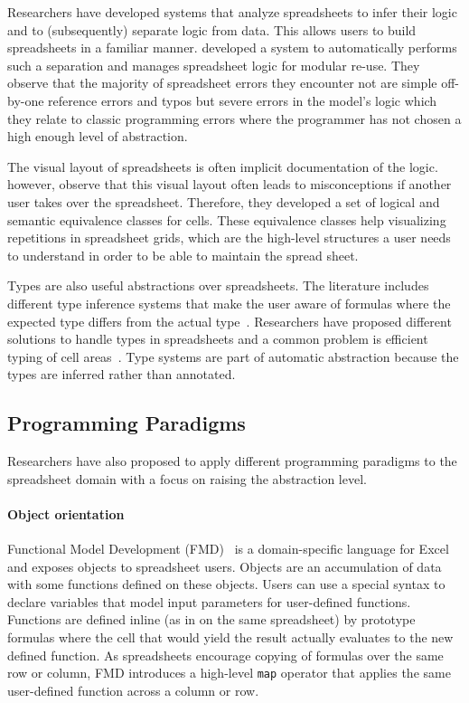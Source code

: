 \documentclass[a4paper]{article}
\begin{document}
Researchers have developed systems that analyze spreadsheets to infer
their logic and to (subsequently) separate logic from data. This
allows users to build spreadsheets in a familiar
manner. \citet{Isakowitz:1995:TLT:195705.195708} developed a system to
automatically performs such a separation and manages spreadsheet logic
for modular re-use. They observe that the majority of spreadsheet
errors they encounter not are simple off-by-one reference errors and
typos but severe errors in the model's logic which they relate to
classic programming errors where the programmer has not chosen a high
enough level of abstraction.

The visual layout of spreadsheets is often implicit documentation of
the logic. \citet{1173080} however, observe that this visual layout
often leads to misconceptions if another user takes over the
spreadsheet. Therefore, they developed a set of logical and semantic
equivalence classes for cells. These equivalence classes help
visualizing repetitions in spreadsheet grids, which are the high-level
structures a user needs to understand in order to be able to maintain
the spread sheet.

Types are also useful abstractions over spreadsheets. The literature
includes different type inference systems that make the user aware of
formulas where the expected type differs from the actual
type~\cite{Abraham:2006:TIS:1140335.1140346,
  Cheng2015Static}. Researchers have proposed different solutions to
handle types in spreadsheets and a common problem is efficient typing
of cell areas~\cite{Abraham:2006:TIS:1140335.1140346,
  Cheng2012Abstract}. Type systems are part of automatic abstraction
because the types are inferred rather than annotated.

\subsection{Programming Paradigms}
\label{sec:progr-parad}

Researchers have also proposed to apply different programming
paradigms to the spreadsheet domain with a focus on raising the
abstraction level.

\paragraph{Object orientation}

Functional Model Development
(FMD)~\cite{Benfield:2009:FFD:1668113.1668121} is a domain-specific
language for Excel and exposes objects to spreadsheet users. Objects
are an accumulation of data with some functions defined on these
objects. Users can use a special syntax to declare variables that
model input parameters for user-defined functions. Functions are
defined inline (as in on the same spreadsheet) by prototype formulas
where the cell that would yield the result actually evaluates to the
new defined function. As spreadsheets encourage copying of formulas
over the same row or column, FMD introduces a high-level \texttt{map}
operator that applies the same user-defined function across a column
or row.
\end{document}
